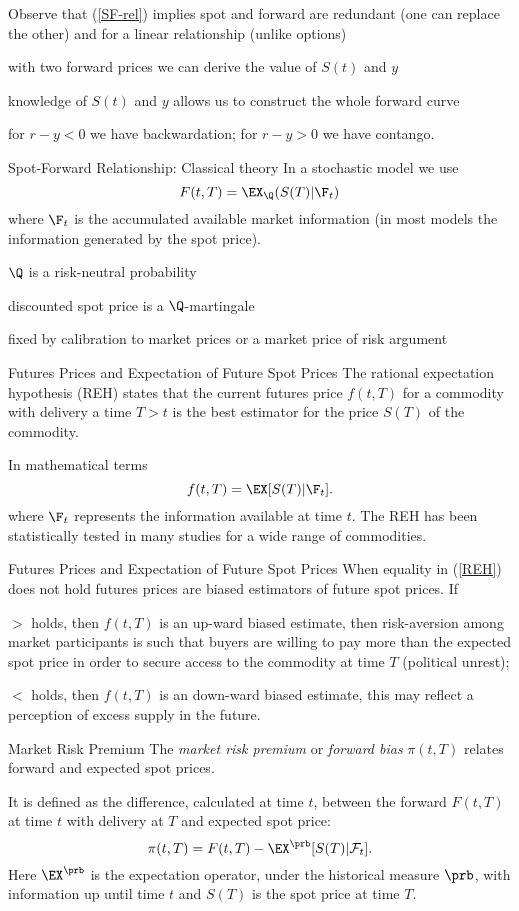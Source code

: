 	Observe that (\ref{SF-rel}) implies 
		spot and forward are redundant (one can replace the other) and for a linear relationship (unlike options) 

		with two forward prices we can derive the value of $S(t)$ and $y$ 

		knowledge of $S(t)$ and $y$ allows us to construct the whole forward curve 

		for $r-y<0$ we have backwardation; for $r-y>0$ we have contango. 


Spot-Forward Relationship: Classical theory 
	In a stochastic model we use 
		$$
		F(t,T)=\EX_{\Q}(S(T)|\F_{t})
		$$
		where $\F_{t}$ is the accumulated available market information (in most models the information generated by the spot price). 

	$\Q$ is a risk-neutral probability 
	
	discounted spot price is a $\Q$-martingale 
	
	fixed by calibration to market prices or a market price of risk argument 


Futures Prices and Expectation of Future Spot Prices 
	The rational expectation hypothesis (REH) states that the current futures price $f(t,T)$ for a commodity with 
	delivery a time $T>t$ is the best estimator for the price $S(T)$ of the commodity. 
	
	In mathematical terms 
		\begin{equation}
		f(t,T)=\EX[S(T)|\F_{t}].\label{REH}
		\end{equation}
		where $\F_{t}$ represents the information available at time $t$. The REH has been statistically tested in many studies for a wide range of commodities. 


Futures Prices and Expectation of Future Spot Prices When equality
	in (\ref{REH}) does not hold futures prices are biased estimators of future spot prices. If 

	$>$ holds, then $f(t,T)$ is an up-ward biased estimate, then risk-aversion among market participants is such that buyers are willing to pay more
	than the expected spot price in order to secure access to the commodity at time $T$ (political unrest); 

	$<$ holds, then $f(t,T)$ is an down-ward biased estimate, this may reflect a perception of excess supply in the future. 


Market Risk Premium 
	The \emph{market risk premium} or \emph{forward bias} $\pi(t,T)$ relates forward and expected spot prices. 

	It is defined as the difference, calculated at time $t$, between the forward $F(t,T)$ at time $t$ with delivery at $T$ and expected spot price: 
		\begin{equation}
		\pi(t,T)=F(t,T)-\EX^{\prb}[S(T)|\mathcal{F}_{t}].\label{forward risk premium}
		\end{equation}
	Here $\EX^{\prb}$ is the expectation operator, under the historical measure $\prb$, with information up until time $t$ and $S(T)$ is
	the spot price at time $T$. 


